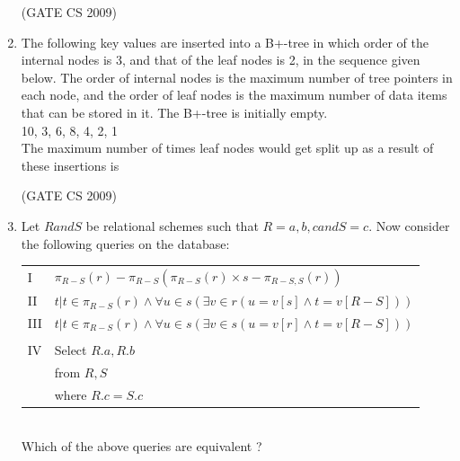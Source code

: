 \documentclass[a4paper, 11pt]{article}
\begin{document}
\begin{enumerate}
    \hfill (GATE CS 2009)

    \item The following key values are inserted into a B+-tree in which order of the internal nodes is 3, and that of the leaf nodes is 2, in the sequence given below. The order of internal nodes is the maximum number of tree pointers in each node, and the order of leaf nodes is the maximum number of data items that can be stored in it. The B+-tree is initially empty.\\
    10, 3, 6, 8, 4, 2, 1\\
    The maximum number of times leaf nodes would get split up as a result of these insertions is
    \begin{enumerate}
    \end{enumerate}

    \hfill (GATE CS 2009)

    \item Let $R and S$ be relational schemes such that $R= {a,b,c} and S = {c}$. Now consider the following queries on the database:\\
    \begin{tabular}{ll}
        I & $\pi_{R-S}(r)-\pi_{R-S}(\pi_{R-S}(r)\times s-\pi_{R-S,S}(r))$ \\
        II & ${t|t \in \pi_{R-S}(r) \land \forall u \in s(\exists v \in r(u=v[s] \land t=v[R-S]))}$\\
        III & ${t|t \in \pi_{R-S}(r) \land \forall u \in s(\exists v \in s(u=v[r] \land t=v[R-S]))}$\\ \\
        IV & Select $R.a, R.b$\\
           & from $R, S$\\
           & where $R.c=S.c$
    \end{tabular}\\

    Which of the above queries are equivalent ?
    \begin{enumerate}
    \end{enumerate}


\end{enumerate}
\end{document}
